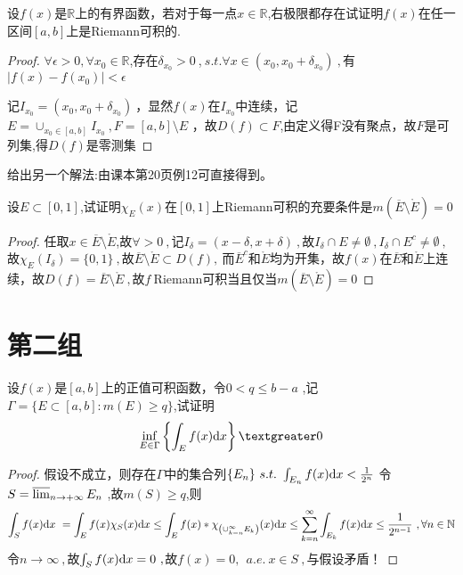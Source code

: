 设$f(x)$是$\mathbb{R}$上的有界函数，若对于每一点$x\in \mathbb{R}$,右极限都存在试证明$f(x)$在任一区间$[a,b]$上是Riemann可积的.
\begin{proof}
	$\forall\epsilon>0,\forall x_0\in \mathbb{R}$,存在$\delta_{x_0}>0\ $,$\ s.t. \forall x\in(x_0,x_0+\delta_{x_0})\ ,$有$\mid f(x)-f(x_0)\mid<\epsilon $ \par 记$I_{x_0}=(x_0,x_0+\delta_{x_0})\ $，显然$f(x)$在$I_{x_0}$中连续，记$E=\cup_{x_0\in [a,b]}I_{x_0}\ ,F=[a,b]\setminus E$ ，故$D(f)\subset F$,由定义得F没有聚点，故$F$是可列集,得$D(f)$是零测集
\end{proof}

给出另一个解法:由课本第20页例12可直接得到。


设$E \subset [0,1]$,试证明$\chi_E(x)$在$[0,1]$上Riemann可积的充要条件是$m(\overline{E}\setminus\mathring{E})=0$
\begin{proof}
任取$x\in\overline{E}\setminus\mathring{E}$,故$\forall>0\ ,$记$I_{\delta}=(x-\delta,x+\delta)\ ,$故$I_{\delta}\cap E\neq \emptyset\ ,I_{\delta}\cap E^c\neq \emptyset\ ,$故$\chi_{E}(I_{\delta})=\{0,1\}\ ,$故$\overline{E}\setminus\mathring{E} \subset D(f),\ $而${\overline{E}}^c$和$\mathring{E}$均为开集，故$f(x)$在$\overline{E}$和$\mathring{E}$上连续，故$D(f)=\overline{E}\setminus\mathring{E}\ ,$故$f\  $Riemann可积当且仅当$m(\overline{E}\setminus\mathring{E})=0$
\end{proof}



\section{第二组}

 设$f(x)$是$[a,b]$上的正值可积函数，令$0<q\leq b-a $ ,记$\Gamma=\{E\subset [a,b]:m(E) \geq q\} $,试证明$$\inf_{E \in \Gamma} \left\{ \int_E f(x) \di{x} \right\} \textgreater 0$$
\begin{proof}
假设不成立，则存在$\Gamma$中的集合列$\{E_n\}\ s.t.\ \int_{E_n}f(x)\di{x}<\frac{1}{2^n}$
令$S=\varlimsup_{n \to +\infty}E_n\ $,故$m(S)\geq q$,则
$$\int_S f(x)\di{x}\ =\int_{E}f(x)\chi_{S}(x)\di{x}\leq \int_{E}f(x)*\chi_{\left(\cup_{k=n}^{\infty}E_k\right)}(x)\di{x}\leq \sum_{k=n}^{\infty}\int_{E_k} f(x)\di{x}\leq \frac{1}{2^{n-1}}\ ,\forall n\in \mathbb{N}$$
令$n\to \infty\ ,$故$\int_S f(x)\di{x}=0\ ,$故$f(x)=0,\ \ a.e.\ x \in S\ ,$与假设矛盾！
\end{proof}

